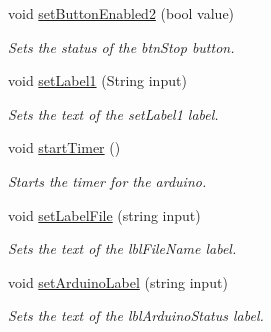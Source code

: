 \begin{DoxyCompactItemize}
void \hyperlink{classkinect_expirement_1_1_kinect_form_a791ef370e5ae37fb90c71341cd4928ba}{set\+Button\+Enabled2} (bool value)
\begin{DoxyCompactList}\small\item\em Sets the status of the {\ttfamily btn\+Stop} button. \end{DoxyCompactList}\item 
void \hyperlink{classkinect_expirement_1_1_kinect_form_abfd5c8462b00f745fa77c19fa61d2eed}{set\+Label1} (String input)
\begin{DoxyCompactList}\small\item\em Sets the text of the {\ttfamily set\+Label1} label. \end{DoxyCompactList}\item 
void \hyperlink{classkinect_expirement_1_1_kinect_form_ac513e5db69e81ee263a5e6ad4d7029d0}{start\+Timer} ()
\begin{DoxyCompactList}\small\item\em Starts the timer for the arduino. \end{DoxyCompactList}\item 
void \hyperlink{classkinect_expirement_1_1_kinect_form_a13a559fc738ff51f58d79991b7de6146}{set\+Label\+File} (string input)
\begin{DoxyCompactList}\small\item\em Sets the text of the {\ttfamily lbl\+File\+Name} label. \end{DoxyCompactList}\item 
void \hyperlink{classkinect_expirement_1_1_kinect_form_a58486dea191eaf6b1110e655699a5ccc}{set\+Arduino\+Label} (string input)\hypertarget{classkinect_expirement_1_1_kinect_form_a58486dea191eaf6b1110e655699a5ccc}{}\label{classkinect_expirement_1_1_kinect_form_a58486dea191eaf6b1110e655699a5ccc}

\begin{DoxyCompactList}\small\item\em Sets the text of the {\ttfamily lbl\+Arduino\+Status} label.  \end{DoxyCompactList}\end{DoxyCompactItemize}
